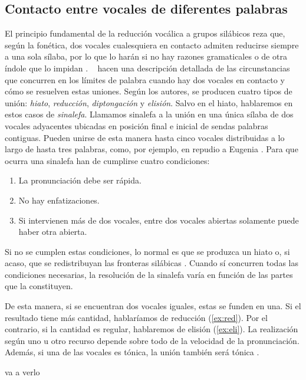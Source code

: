 \subsection{Contacto entre vocales de diferentes palabras}
El principio fundamental de la reducción vocálica a grupos silábicos reza que, según la fonética, dos vocales cualesquiera en contacto admiten reducirse siempre a una sola sílaba, por lo que lo harán si no hay razones gramaticales o de otra índole que lo impidan \parencite[136]{navarrotomas2004}. \citeauthor{canellada1987}~\parencite*[55]{canellada1987} hacen una descripción detallada de las circunstancias que concurren en los límites de palabra cuando hay dos vocales en contacto y cómo se resuelven estas uniones. Según los autores, se producen cuatro tipos de unión: \textit{hiato}, \textit{reducción}, \textit{diptongación} y \textit{elisión}. Salvo en el hiato, hablaremos en estos casos de \textit{sinalefa}. Llamamos sinalefa a la unión en una única sílaba de dos vocales adyacentes ubicadas en posición final e inicial de sendas palabras contiguas. Pueden unirse de esta manera hasta cinco vocales distribuidas a lo largo de hasta tres palabras, como, por ejemplo, en \textlangle{}repudio a Eugenia\textrangle{} . Para que ocurra una sinalefa han de cumplirse cuatro condiciones:
\begin{enumerate}
	\item La pronunciación debe ser rápida.
	\item No hay enfatizaciones.
	\item Si intervienen más de dos vocales, entre dos vocales abiertas solamente puede haber otra abierta.
\end{enumerate}

Si no se cumplen estas condiciones, lo normal es que se produzca un hiato  o, si acaso, que se redistribuyan las fronteras silábicas . Cuando sí concurren todas las condiciones necesarias, la resolución de la sinalefa varía en función de las partes que la constituyen. 

De esta manera, si  se encuentran dos vocales iguales, estas se funden en una. Si el resultado tiene más cantidad, hablaríamos de reducción (\ref{ex:red}). Por el contrario, si la cantidad es regular, hablaremos de elisión (\ref{ex:eli}). La realización según uno u otro recurso depende sobre todo de la velocidad de la pronunciación. Además, si una de las vocales es tónica, la unión también será tónica \parencite[138-139]{navarrotomas2004}.
\begin{exe}
\ex\textlangle{}va a verlo\textrangle{}\begin{xlist}
\label{ex:red}
\label{ex:eli}	
\end{xlist}
\end{exe}

